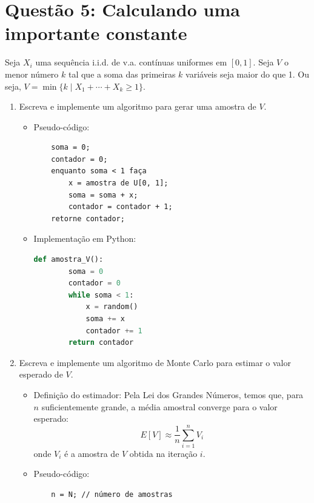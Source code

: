 \documentclass[12 pt]{article}
\begin{document}
\section*{Questão 5: Calculando uma importante constante}

Seja $X_i$ uma sequência i.i.d. de v.a. contínuas uniformes em $[0, 1]$. Seja $V$ o menor número $k$ tal que a soma das primeiras $k$ variáveis seja maior do que 1. Ou seja, $V = \min\{k \mid X_1 + \cdots + X_k \geq 1\}$.

\begin{enumerate}
    \item Escreva e implemente um algoritmo para gerar uma amostra de $V$.
    \begin{tcolorbox}[colframe=black, title=Resposta:]
        \begin{itemize}
            \item Pseudo-código:
            \begin{verbatim}
    soma = 0;
    contador = 0;
    enquanto soma < 1 faça
        x = amostra de U[0, 1];
        soma = soma + x;
        contador = contador + 1;
    retorne contador;
            \end{verbatim}
            \item Implementação em Python:
            \begin{lstlisting}[language=Python]
    def amostra_V():
        soma = 0
        contador = 0
        while soma < 1:
            x = random()
            soma += x
            contador += 1
        return contador
            \end{lstlisting}
        \end{itemize}
    \end{tcolorbox}
    \item Escreva e implemente um algoritmo de Monte Carlo para estimar o valor esperado de $V$.
    \begin{tcolorbox}[colframe=black, title=Resposta:]
        \begin{itemize}
            \item Definição do estimador:
            Pela Lei dos Grandes Números, temos que, para $n$ suficientemente grande, a média amostral converge para o valor esperado:
            $$
            E[V] \approx \frac{1}{n} \sum_{i=1}^n V_i
            $$
            onde $V_i$ é a amostra de $V$ obtida na iteração $i$.
            \item Pseudo-código:
            \begin{verbatim}
    n = N; // número de amostras

\end{verbatim}
\end{itemize}
\end{tcolorbox}
\end{enumerate}
\end{document}
